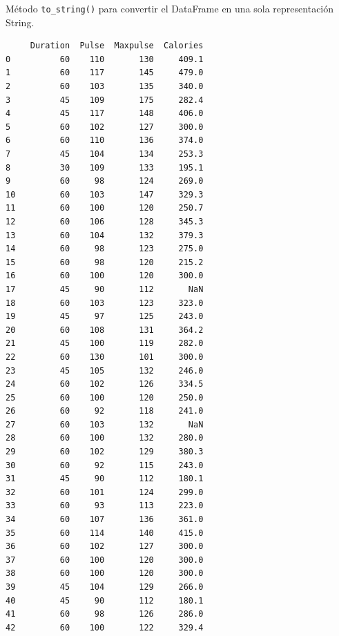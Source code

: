 \begin{code} Método \texttt{to\_string()} para convertir el DataFrame en una sola representación String.
\begin{Shaded}
\begin{Highlighting}[]

\OperatorTok{=}\NormalTok{)}

\end{Highlighting}
\end{Shaded}

\begin{verbatim}
     Duration  Pulse  Maxpulse  Calories
0          60    110       130     409.1
1          60    117       145     479.0
2          60    103       135     340.0
3          45    109       175     282.4
4          45    117       148     406.0
5          60    102       127     300.0
6          60    110       136     374.0
7          45    104       134     253.3
8          30    109       133     195.1
9          60     98       124     269.0
10         60    103       147     329.3
11         60    100       120     250.7
12         60    106       128     345.3
13         60    104       132     379.3
14         60     98       123     275.0
15         60     98       120     215.2
16         60    100       120     300.0
17         45     90       112       NaN
18         60    103       123     323.0
19         45     97       125     243.0
20         60    108       131     364.2
21         45    100       119     282.0
22         60    130       101     300.0
23         45    105       132     246.0
24         60    102       126     334.5
25         60    100       120     250.0
26         60     92       118     241.0
27         60    103       132       NaN
28         60    100       132     280.0
29         60    102       129     380.3
30         60     92       115     243.0
31         45     90       112     180.1
32         60    101       124     299.0
33         60     93       113     223.0
34         60    107       136     361.0
35         60    114       140     415.0
36         60    102       127     300.0
37         60    100       120     300.0
38         60    100       120     300.0
39         45    104       129     266.0
40         45     90       112     180.1
41         60     98       126     286.0
42         60    100       122     329.4

\end{verbatim}
\end{code}
